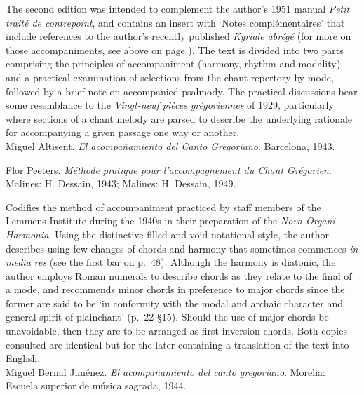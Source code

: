      \parindent=20pt
     \hangindent=20pt
     The second edition was intended to complement the author's 1951 manual \emph{Petit traité de contrepoint}, and contains an insert with `Notes complémentaires' that include references to the author's recently published \emph{Kyriale abrégé} (for more on those accompaniments, see above on page \pageref{hl:potiron_kyrialeabrege}). The text is divided into two parts comprising the principles of accompaniment (harmony, rhythm and modality) and a practical examination of selections from the chant repertory by mode, followed by a brief note on accompanied psalmody. The practical discussions bear some resemblance to the \emph{Vingt-neuf pièces grégoriennes} of 1929, particularly where sections of a chant melody are parsed to describe the underlying rationale for accompanying a given passage one way or another.\\

    \parindent=0pt
    \hangindent=0pt
  \covid{}Miguel Altisent. \emph{El acompa\~{n}amiento del Canto Gregoriano}. Barcelona, 1943. \\\pagebreak{}

    \parindent=0pt
    \hangindent=0pt
  Flor Peeters. \emph{Méthode pratique pour l'accompagnement du Chant Grégorien}. Malines:  H. Dessain, 1943;  Malines:  H. Dessain, 1949.

     \parindent=20pt
     \hangindent=20pt
     Codifies the method of accompaniment practiced by staff members of the Lemmens Institute during the 1940s in their preparation of the \emph{Nova Organi Harmonia}. Using the distinctive filled-and-void notational style, the author describes using few changes of chords and harmony that sometimes commences \emph{in media res} (see the first bar on p.~48). Although the harmony is diatonic, the author employs Roman numerals to describe chords as they relate to the final of a mode, and recommends minor chords in preference to major chords since the former are said to be `in conformity with the modal and archaic character and general spirit of plainchant' (p.~22 \S{}15). Should the use of major chords be unavoidable, then they are to be arranged as first-inversion chords. Both copies consulted are identical but for the later containing a translation of the text into English.\\

    \parindent=0pt
    \hangindent=0pt
  \covid{}Miguel Bernal Jim\'{e}nez. \emph{El acompa\~{n}amiento del canto gregoriano}. Morelia:  Escuela superior de música sagrada, 1944. \\

